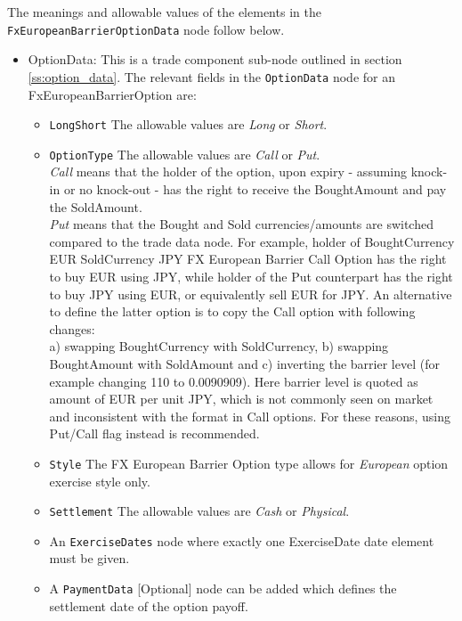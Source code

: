 The meanings and allowable values of the elements in the \lstinline!FxEuropeanBarrierOptionData!  node follow below.

\begin{itemize}

\item OptionData: This is a trade component sub-node outlined in section \ref{ss:option_data}. 
The relevant fields in the \lstinline!OptionData! node for an FxEuropeanBarrierOption are:

\begin{itemize}
\item \lstinline!LongShort! The allowable values are \emph{Long} or \emph{Short}.

\item \lstinline!OptionType! The allowable values are \emph{Call} or \emph{Put}. \\
 \emph{Call} means that the holder of the option, upon expiry - assuming knock-in or no knock-out - has the right to receive the BoughtAmount and pay the SoldAmount. \\\emph{Put} means that the Bought and Sold currencies/amounts are switched compared to the trade data node. 
For example, holder of BoughtCurrency EUR SoldCurrency JPY FX European Barrier Call Option has the right to buy EUR using JPY, while
holder of the Put counterpart has the right to buy JPY using EUR, or equivalently sell EUR for JPY. An alternative to define the latter option is to copy the Call option with following changes:\\
a) swapping BoughtCurrency with SoldCurrency, b) swapping BoughtAmount with SoldAmount and c) inverting the barrier level (for example changing 110 to 0.0090909). Here barrier level is
quoted as amount of EUR per unit JPY, which is not commonly seen on market and inconsistent with the format in Call options. For these reasons, using Put/Call flag instead is recommended.

\item  \lstinline!Style! The FX European Barrier Option type allows for \emph{European} option exercise style only.

\item  \lstinline!Settlement! The allowable values are \emph{Cash} or \emph{Physical}.

\item An \lstinline!ExerciseDates! node where exactly one ExerciseDate date element must be given.

\item A \lstinline!PaymentData! [Optional] node can be added which defines the settlement date of the option payoff.


\end{itemize}
\end{itemize}
